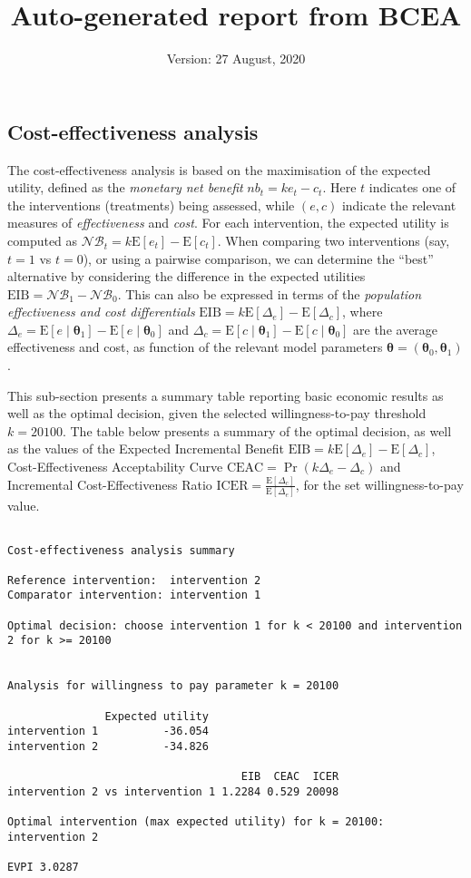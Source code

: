 \documentclass[
]{article}
\title{Auto-generated report from BCEA}
\author{}
\date{\vspace{-2.5em}Version: 27 August, 2020}
\begin{document}
\maketitle

\hypertarget{cost-effectiveness-analysis}{%
\subsection{Cost-effectiveness
analysis}\label{cost-effectiveness-analysis}}

The cost-effectiveness analysis is based on the maximisation of the
expected utility, defined as the \emph{monetary net benefit}
\(nb_t=ke_t-c_t\). Here \(t\) indicates one of the interventions
(treatments) being assessed, while \((e,c)\) indicate the relevant
measures of \emph{effectiveness} and \emph{cost}. For each intervention,
the expected utility is computed as
\(\mathcal{NB}_t=k\mbox{E}[e_t]-\mbox{E}[c_t]\). When comparing two
interventions (say, \(t=1\) vs \(t=0\)), or using a pairwise comparison,
we can determine the ``best'' alternative by considering the difference
in the expected utilities \(\mbox{EIB}=\mathcal{NB}_1-\mathcal{NB}_0\).
This can also be expressed in terms of the \emph{population
effectiveness and cost differentials}
\(\mbox{EIB}=k\mbox{E}[\Delta_e]-\mbox{E}[\Delta_c]\), where
\(\Delta_e=\mbox{E}[e\mid\bm\theta_1]-\mbox{E}[e\mid\bm\theta_0]\) and
\(\Delta_c=\mbox{E}[c\mid\bm\theta_1]-\mbox{E}[c\mid\bm\theta_0]\) are
the average effectiveness and cost, as function of the relevant model
parameters \(\bm\theta=(\bm\theta_0,\bm\theta_1)\).

This sub-section presents a summary table reporting basic economic
results as well as the optimal decision, given the selected
willingness-to-pay threshold \(k=20100\). The table below presents a
summary of the optimal decision, as well as the values of the Expected
Incremental Benefit
\(\mbox{EIB}=k\mbox{E}[\Delta_e]-\mbox{E}[\Delta_c]\),
Cost-Effectiveness Acceptability Curve
\(\mbox{CEAC}=\Pr(k\Delta_e-\Delta_c)\) and Incremental
Cost-Effectiveness Ratio
\(\mbox{ICER}=\displaystyle\frac{\mbox{E}[\Delta_c]}{\mbox{E}[\Delta_e]}\),
for the set willingness-to-pay value.

\begin{verbatim}

Cost-effectiveness analysis summary 

Reference intervention:  intervention 2
Comparator intervention: intervention 1

Optimal decision: choose intervention 1 for k < 20100 and intervention 2 for k >= 20100


Analysis for willingness to pay parameter k = 20100

               Expected utility
intervention 1          -36.054
intervention 2          -34.826

                                    EIB  CEAC  ICER
intervention 2 vs intervention 1 1.2284 0.529 20098

Optimal intervention (max expected utility) for k = 20100: intervention 2
           
EVPI 3.0287
\end{verbatim}
\end{document}
